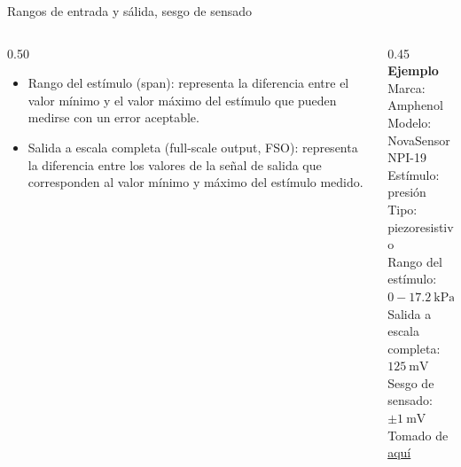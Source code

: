 \documentclass[aspectratio=169]{beamer}
\begin{document}
\begin{frame}{Rangos de entrada y sálida, sesgo de sensado}
    \begin{columns}[c, onlytextwidth]
        \begin{column}{0.50\textwidth}
            \begin{itemize}
                \item Rango del estímulo (span): representa la diferencia entre el valor mínimo y el valor máximo del estímulo que pueden medirse con un error aceptable.
                \item Salida a escala completa (full-scale output, FSO): representa la diferencia entre los valores de la señal de salida que corresponden al valor mínimo y máximo del estímulo medido. 
            \end{itemize}
        \end{column}
        \begin{column}{0.45\textwidth}
            \textbf{Ejemplo}\\[4pt]
            Marca: Amphenol\\[4pt]
            Modelo: NovaSensor NPI-19\\[4pt]
            Estímulo: presión\\[4pt]
            Tipo: piezoresistivo\\[4pt]
            Rango del estímulo: $0  - \SI{17.2}{\kilo\pascal}$\\[4pt]
            Salida a escala completa: $\SI{125}{\milli\volt}$\\[4pt]
            Sesgo de sensado: $\pm \SI{1}{\milli\volt}$\\[10pt]
            \tiny{Tomado de \href{https://f.hubspotusercontent40.net/hubfs/9035299/Documents/AAS-920-298B-NovaSensor\%20NPI-19-REVISED-061714-web.pdf}{aquí}}
        \end{column}
    \end{columns}
\end{frame}
\end{document}
